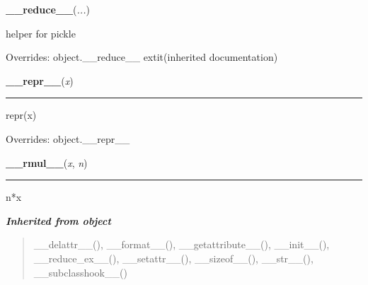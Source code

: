     \vspace{0.5ex}

\hspace{.8\funcindent}\begin{boxedminipage}{\funcwidth}

    \raggedright \textbf{\_\_reduce\_\_}(\textit{...})

\setlength{\parskip}{2ex}
    helper for pickle

\setlength{\parskip}{1ex}
      Overrides: object.\_\_reduce\_\_ 	extit{(inherited documentation)}

    \end{boxedminipage}

    \vspace{0.5ex}

\hspace{.8\funcindent}\begin{boxedminipage}{\funcwidth}

    \raggedright \textbf{\_\_repr\_\_}(\textit{x})

    \vspace{-1.5ex}

    \rule{\textwidth}{0.5\fboxrule}
\setlength{\parskip}{2ex}
    repr(x)

\setlength{\parskip}{1ex}
      Overrides: object.\_\_repr\_\_

    \end{boxedminipage}

    \label{resource:struct_rusage:__rmul__}

    \vspace{0.5ex}

\hspace{.8\funcindent}\begin{boxedminipage}{\funcwidth}

    \raggedright \textbf{\_\_rmul\_\_}(\textit{x}, \textit{n})

    \vspace{-1.5ex}

    \rule{\textwidth}{0.5\fboxrule}
\setlength{\parskip}{2ex}
    n*x

\setlength{\parskip}{1ex}
    \end{boxedminipage}


\large{\textbf{\textit{Inherited from object}}}

\begin{quote}
\_\_delattr\_\_(), \_\_format\_\_(), \_\_getattribute\_\_(), \_\_init\_\_(), \_\_reduce\_ex\_\_(), \_\_setattr\_\_(), \_\_sizeof\_\_(), \_\_str\_\_(), \_\_subclasshook\_\_()
\end{quote}

